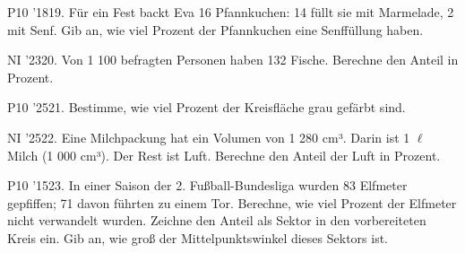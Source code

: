 \documentclass[11pt]{article}
\begin{document}
\pfgruppe{}
\begin{pfaufg}{P10 ’18}{19.}{}
Für ein Fest backt Eva 16 Pfannkuchen: 14 füllt sie mit Marmelade, 2 mit Senf. Gib an, wie viel Prozent der Pfannkuchen eine Senffüllung haben.
\end{pfaufg}
\pfgruppe{}
\begin{pfaufg}{NI ’23}{20.}{}
Von 1 100 befragten Personen haben 132 Fische. Berechne den Anteil in Prozent.
\end{pfaufg}
\pfgruppe{}
\begin{pfaufg}{P10 ’25}{21.}{}
Bestimme, wie viel Prozent der Kreisfläche grau gefärbt sind.
\par\smallskip\noindent {}\par
{}
\end{pfaufg}
\pfgruppe{}
\begin{pfaufg}{NI ’25}{22.}{}
Eine Milchpackung hat ein Volumen von 1 280 cm³. Darin ist 1 $\ell$ Milch (1 000 cm³). Der Rest ist Luft. Berechne den Anteil der Luft in Prozent.
\end{pfaufg}
\pfgruppe{}
\begin{pfaufg}{P10 ’15}{23.}{}
In einer Saison der 2. Fußball-Bundesliga wurden 83 Elfmeter gepfiffen; 71 davon führten zu einem Tor. Berechne, wie viel Prozent der Elfmeter nicht verwandelt wurden. Zeichne den Anteil als Sektor in den vorbereiteten Kreis ein. Gib an, wie groß der Mittelpunktswinkel dieses Sektors ist.
\par\smallskip\noindent \kreisleer[2]\par
{}
\end{pfaufg}
\end{document}
